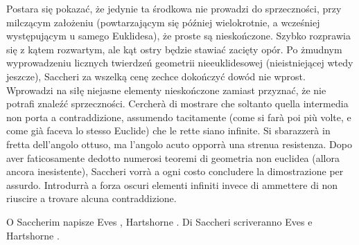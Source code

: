 Postara się pokazać, że jedynie ta środkowa nie prowadzi do sprzeczności, przy milczącym założeniu (powtarzającym się później wielokrotnie, a wcześniej występującym u samego Euklidesa), że proste są nieskończone. %
Szybko rozprawia się z kątem rozwartym, ale kąt ostry będzie stawiać zacięty opór. %
Po żmudnym wyprowadzeniu licznych twierdzeń geometrii nieeuklidesowej (nieistniejącej wtedy jeszcze), Saccheri za wszelką cenę zechce dokończyć dowód nie wprost. %
Wprowadzi na siłę niejasne elementy nieskończone zamiast przyznać, że nie potrafi znaleźć sprzeczności. %
Cercherà di mostrare che soltanto quella intermedia non porta a contraddizione, assumendo tacitamente (come si farà poi più volte, e come già faceva lo stesso Euclide) che le rette siano infinite. %
Si sbarazzerà in fretta dell'angolo ottuso, ma l'angolo acuto opporrà una strenua resistenza. %
Dopo aver faticosamente dedotto numerosi teoremi di geometria non euclidea (allora ancora inesistente), Saccheri vorrà a ogni costo concludere la dimostrazione per assurdo. %
Introdurrà a forza oscuri elementi infiniti invece di ammettere di non riuscire a trovare alcuna contraddizione. %


O Saccherim napisze Eves \cite[s. 284, 285, 298-301]{eves1_1972}, Hartshorne \cite[s. 305-312]{hartshorne_2000}. %
Di Saccheri scriveranno Eves \cite[p. 284, 285, 298-301]{eves1_1972} e Hartshorne \cite[p. 305-312]{hartshorne_2000}. %

%